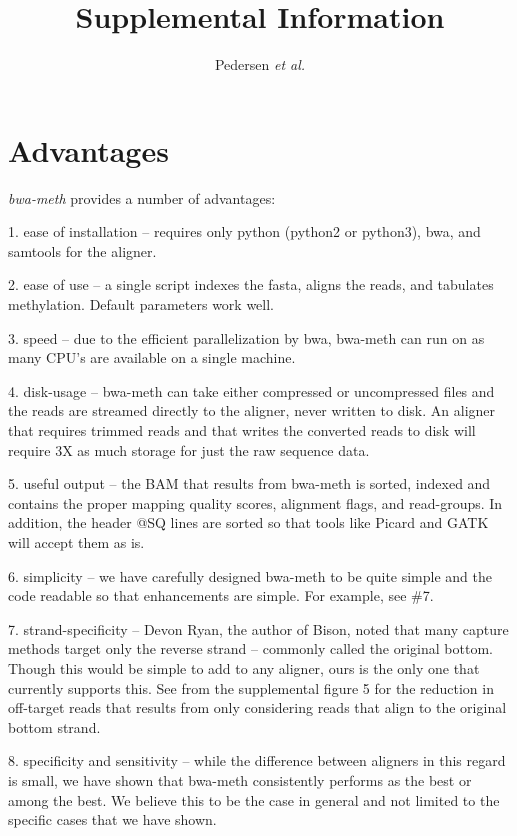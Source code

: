 \documentclass[12pt]{article}
\title{Supplemental Information}
\author{Pedersen \textit{et al.}}
\date{}
\begin{document}
\maketitle

\section{Advantages}
\textit{bwa-meth} provides a number of advantages:

1. ease of installation -- requires only python (python2 or python3), bwa,
   and samtools for the aligner.

2. ease of use -- a single script indexes the fasta, aligns the reads, and
   tabulates methylation. Default parameters work well.

3. speed -- due to the efficient parallelization by bwa, bwa-meth can run on
   as many CPU's are available on a single machine.

4. disk-usage -- bwa-meth can take either compressed or uncompressed files
   and the reads are streamed directly to the aligner, never written to disk. An
   aligner that requires trimmed reads and that writes the converted reads to
   disk will require 3X as much storage for just the raw sequence data.

5. useful output -- the BAM that results from bwa-meth is sorted, indexed and
   contains the proper mapping quality scores, alignment flags, and read-groups.
   In addition, the header @SQ lines are sorted so that tools like Picard and
   GATK will accept them as is.

6. simplicity -- we have carefully designed bwa-meth to be quite simple and
   the code readable so that enhancements are simple. For example, see \#7.

7. strand-specificity -- Devon Ryan,
   the author of Bison, noted that many capture methods target only the reverse
   strand -- commonly called the original bottom. Though this would be simple to
   add to any aligner, ours is the only one that currently supports this. See
   from the supplemental figure 5 for the reduction in off-target reads that results
   from only considering reads that align to the original bottom strand.

8. specificity and sensitivity -- while the difference between aligners in
   this regard is small, we have shown that bwa-meth consistently performs as
   the best or among the best. We believe this to be the case in general and
   not limited to the specific cases that we have shown.
\end{document}
